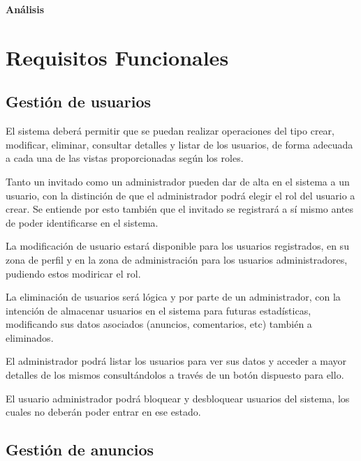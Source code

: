 \newpage{\pagestyle{empty}\cleardoublepage}
\newpage
\vspace*{\fill}
    \begin{center}
      \thispagestyle{empty} \vspace*{0cm} \textbf{\huge
An\'{a}lisis}
    \end{center}
    \vspace*{\fill}
\newpage{\pagestyle{empty}\cleardoublepage}
\chapter{Requisitos Funcionales}

\section{Gesti\'{o}n de usuarios}

El sistema deber\'{a} permitir que se puedan realizar operaciones del tipo crear, modificar, eliminar, consultar detalles y listar de los usuarios, de forma adecuada a cada una de las vistas proporcionadas seg\'{u}n los roles.

Tanto un invitado como un administrador pueden dar de alta en el sistema a un usuario, con la distinci\'{o}n de que el administrador podr\'{a} elegir el rol del usuario a crear. Se entiende por esto tambi\'{e}n que el invitado se registrar\'{a} a s\'{i} mismo antes de poder identificarse en el sistema.

La modificaci\'{o}n de usuario estar\'{a} disponible para los usuarios registrados, en su zona de perfil y en la zona de administraci\'{o}n para los usuarios administradores, pudiendo estos modiricar el rol.

La eliminaci\'{o}n de usuarios ser\'{a} l\'{o}gica y por parte de un administrador, con la intenci\'{o}n de almacenar usuarios en el sistema para futuras estad\'{i}sticas, modificando sus datos asociados (anuncios, comentarios, etc) tambi\'{e}n a eliminados.

El administrador podr\'{a} listar los usuarios para ver sus datos y acceder a mayor detalles de los mismos consult\'{a}ndolos a trav\'{e}s de un bot\'{o}n dispuesto para ello.

El usuario administrador podr\'{a} bloquear y desbloquear usuarios del sistema, los cuales no deber\'{a}n poder entrar en ese estado.

\section{Gesti\'{o}n de anuncios}

